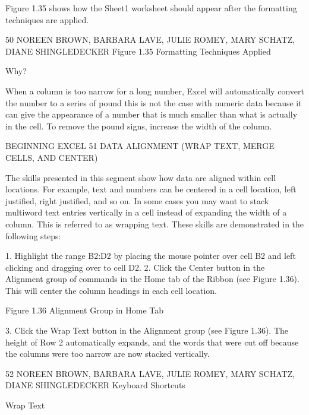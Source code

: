 Figure 1.35 shows how the Sheet1 worksheet should appear after the formatting techniques are
applied.



50 NOREEN BROWN, BARBARA LAVE, JULIE ROMEY, MARY SCHATZ, DIANE SHINGLEDECKER
Figure 1.35 Formatting Techniques Applied




Why?


When a column is too narrow for a long number, Excel will automatically convert the number to a series of pound
this is not the case with numeric data because it can give the appearance of a number that is much smaller than
what is actually in the cell. To remove the pound signs, increase the width of the column.




BEGINNING EXCEL 51
DATA ALIGNMENT (WRAP TEXT, MERGE CELLS, AND CENTER)

The skills presented in this segment show how data are aligned within cell locations. For example, text
and numbers can be centered in a cell location, left justified, right justified, and so on. In some cases
you may want to stack multiword text entries vertically in a cell instead of expanding the width of a
column. This is referred to as wrapping text. These skills are demonstrated in the following steps:

1. Highlight the range B2:D2 by placing the mouse pointer over cell B2 and left clicking and
dragging over to cell D2.
2. Click the Center button in the Alignment group of commands in the Home tab of the Ribbon
(see Figure 1.36). This will center the column headings in each cell location.




Figure 1.36 Alignment Group in Home Tab




3. Click the Wrap Text button in the Alignment group (see Figure 1.36). The height of Row 2
automatically expands, and the words that were cut off because the columns were too narrow
are now stacked vertically.




52 NOREEN BROWN, BARBARA LAVE, JULIE ROMEY, MARY SCHATZ, DIANE SHINGLEDECKER
Keyboard Shortcuts


Wrap Text




